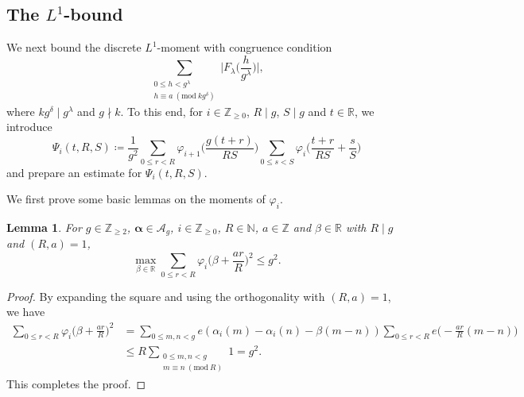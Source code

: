 \documentclass[hidelinks]{amsart}
\numberwithin{equation}{section}
\theoremstyle{plain}
\newtheorem{lemma}{Lemma}
\theoremstyle{definition}
\let\tmp\phi
\let\phi\varphi
\let\varphi\tmp
\let\tmp\epsilon
\let\epsilon\varepsilon
\let\varepsilon\tmp
\renewcommand{\mod}[1]{(\mathrm{mod}\ #1)}
\begin{document}
\subsection{The \texorpdfstring{$L^{1}$}{L1}-bound}
\label{subsec:L1_bound}
We next bound the discrete $L^{1}$-moment with congruence condition
\[
\sum_{\substack{
0\le h<g^{\lambda}\\
h\equiv a\ \mod{kg^{\delta}}
}}
\biggl|F_{\lambda}\biggl(\frac{h}{g^{\lambda}}\biggr)\biggr|,
\]
where $kg^{\delta}\mid g^{\lambda}$ and $g\nmid k$.
To this end, for $i\in\mathbb{Z}_{\ge0}$, $R\mid g$, $S\mid g$ and $t\in\mathbb{R}$, we introduce
\begin{equation}
\label{def:Psi}
\Psi_{i}(t,R,S)
\coloneqq
\frac{1}{g^{2}}
\sum_{0\le r<R}
\phi_{i+1}\biggl(\frac{g(t+r)}{RS}\biggr)
\sum_{0\le s<S}
\phi_{i}\biggl(\frac{t+r}{RS}+\frac{s}{S}\biggr)
\end{equation}
and prepare an estimate for $\Psi_{i}(t,R,S)$.

We first prove some basic lemmas on the moments of $\phi_{i}$.
\begin{lemma}
\label{lem:L2_orthogonality}
For $g\in\mathbb{Z}_{\ge2}$, $\bm{\alpha}\in\mathscr{A}_{g}$,
$i\in\mathbb{Z}_{\ge0}$, $R\in\mathbb{N}$, $a\in\mathbb{Z}$ and $\beta\in\mathbb{R}$
with $R\mid g$ and $(R,a)=1$,
\[
\max_{\beta\in\mathbb{R}}
\sum_{0\le r<R}
\phi_{i}\biggl(\beta+\frac{ar}{R}\biggr)^{2}
\le
g^{2}.
\]
\end{lemma}
\begin{proof}
By expanding the square and using the orthogonality with $(R,a)=1$, we have
\begin{align}
\sum_{0\le r<R}
\phi_{i}\biggl(\beta+\frac{ar}{R}\biggr)^{2}
&=
\sum_{0\le m,n<g}
e(\alpha_{i}(m)-\alpha_{i}(n)-\beta(m-n))
\sum_{0\le r<R}
e\biggl(-\frac{ar}{R}(m-n)\biggr)\\
&\le
R
\sum_{\substack{
0\le m,n<g\\
m\equiv n\ \mod{R}
}}
1
=
g^{2}.
\end{align}
This completes the proof.
\end{proof}
\end{document}
